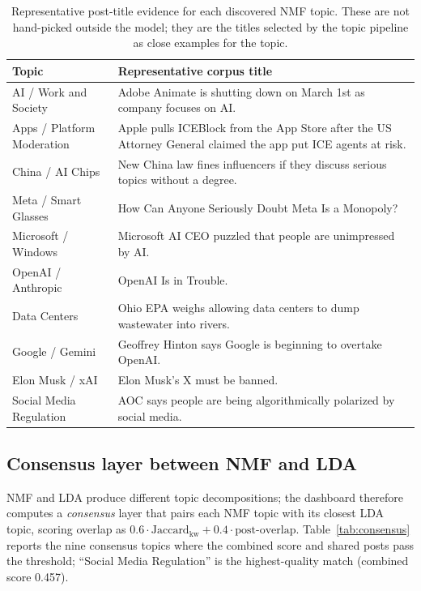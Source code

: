 \documentclass[11pt,a4paper]{article}
\begin{document}
\begin{table}[H]
\centering
\small
\caption{Representative post-title evidence for each discovered NMF topic. These are not hand-picked
outside the model; they are the titles selected by the topic pipeline as close examples for the topic.}
\label{tab:topic-evidence}
\renewcommand{\arraystretch}{1.15}
\begin{tabularx}{\linewidth}{p{3.4cm} X}
\toprule
\textbf{Topic} & \textbf{Representative corpus title} \\
\midrule
AI / Work and Society & Adobe Animate is shutting down on March 1st as company focuses on AI. \\
Apps / Platform Moderation & Apple pulls ICEBlock from the App Store after the US Attorney General claimed the app put ICE agents at risk. \\
China / AI Chips & New China law fines influencers if they discuss serious topics without a degree. \\
Meta / Smart Glasses & How Can Anyone Seriously Doubt Meta Is a Monopoly? \\
Microsoft / Windows & Microsoft AI CEO puzzled that people are unimpressed by AI. \\
OpenAI / Anthropic & OpenAI Is in Trouble. \\
Data Centers & Ohio EPA weighs allowing data centers to dump wastewater into rivers. \\
Google / Gemini & Geoffrey Hinton says Google is beginning to overtake OpenAI. \\
Elon Musk / xAI & Elon Musk's X must be banned. \\
Social Media Regulation & AOC says people are being algorithmically polarized by social media. \\
\bottomrule
\end{tabularx}
\end{table}

\subsection{Consensus layer between NMF and LDA}
\label{sec:consensus}
NMF and LDA produce different topic decompositions; the dashboard therefore computes a
\emph{consensus} layer that pairs each NMF topic with its closest LDA topic, scoring overlap as
$0.6\cdot \text{Jaccard}_{\text{kw}} + 0.4\cdot \text{post-overlap}$. Table~\ref{tab:consensus}
reports the nine consensus topics where the combined score and shared posts pass the threshold;
``Social Media Regulation'' is the highest-quality match (combined score 0.457).
\end{document}
